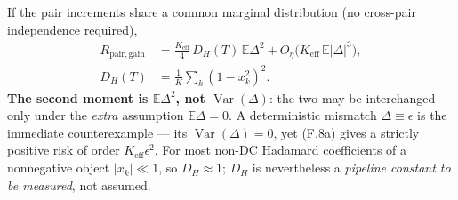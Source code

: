 If the pair increments share a common marginal distribution (no cross-pair independence required),
\begin{equation}
\begin{aligned}
R_{\mathrm{pair,gain}}
&=\frac{K_{\mathrm{eff}}}{4}\,D_H(T)\,\mathbb{E}\Delta^2
+O_\eta\!\big(K_{\mathrm{eff}}\,\mathbb{E}|\Delta|^3\big),\\
D_H(T)&=\frac{1}{K}\sum_k(1-x_k^2)^2 .
\end{aligned}
\tag{F.8}
\end{equation}
\textbf{The second moment is $\mathbb{E}\Delta^2$, not $\operatorname{Var}(\Delta)$}: the two may be interchanged only under the \emph{extra} assumption $\mathbb{E}\Delta=0$. A deterministic mismatch $\Delta\equiv\epsilon$ is the immediate counterexample --- its $\operatorname{Var}(\Delta)=0$, yet (F.8a) gives a strictly positive risk of order $K_{\mathrm{eff}}\epsilon^2$. For most non-DC Hadamard coefficients of a nonnegative object $|x_k|\ll1$, so $D_H\approx1$; $D_H$ is nevertheless a \emph{pipeline constant to be measured}, not assumed.


